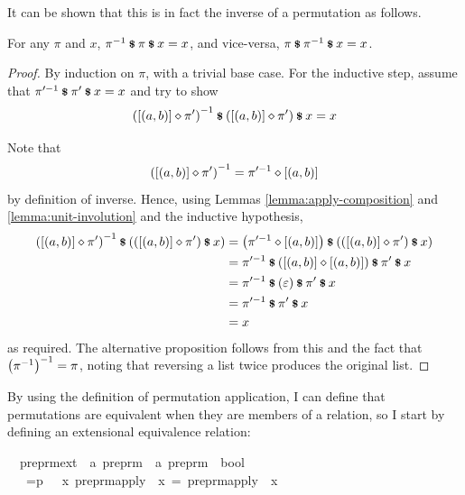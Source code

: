 It can be shown that this is in fact the inverse of a permutation as follows.
\begin{lemma}
\label{lemma:inverse-involution}
For any \(\pi\) and \(x\), \(\pi^{-1} \mathbin{\textrm{\footnotesize{\textbf{\$}}}} \pi \mathbin{\textrm{\footnotesize{\textbf{\$}}}} x = x\), and vice-versa, \(\pi \mathbin{\textrm{\footnotesize{\textbf{\$}}}} \pi^{-1} \mathbin{\textrm{\footnotesize{\textbf{\$}}}} x = x\).
\end{lemma}
\begin{proof}
By induction on \(\pi\), with a trivial base case.
For the inductive step, assume that \(\pi'^{-1} \mathbin{\textrm{\footnotesize{\textbf{\$}}}} \pi' \mathbin{\textrm{\footnotesize{\textbf{\$}}}} x = x\) and try to show
\[
\left([\left(a, b\right)] \diamond \pi'\right)^{-1} \mathbin{\textrm{\footnotesize{\textbf{\$}}}} \left([\left(a, b\right)] \diamond \pi'\right) \mathbin{\textrm{\footnotesize{\textbf{\$}}}} x = x
\]

Note that
\[
\left([\left(a, b\right)] \diamond \pi'\right)^{-1} = \pi'^{-1} \diamond [\left(a, b\right)]
\]
by definition of inverse.
Hence, using Lemmas \ref{lemma:apply-composition} and \ref{lemma:unit-involution} and the inductive hypothesis,
\begin{align*}
\left([\left(a, b\right)] \diamond \pi'\right)^{-1} \mathbin{\textrm{\footnotesize{\textbf{\$}}}} \left(\left([\left(a, b\right)] \diamond \pi'\right) \mathbin{\textrm{\footnotesize{\textbf{\$}}}} x\right)
&= \left(\pi'^{-1} \diamond [\left(a, b\right)]\right) \mathbin{\textrm{\footnotesize{\textbf{\$}}}} \left(\left([\left(a, b\right)] \diamond \pi'\right) \mathbin{\textrm{\footnotesize{\textbf{\$}}}} x\right)\\
&= \pi'^{-1} \mathbin{\textrm{\footnotesize{\textbf{\$}}}} \left([\left(a, b\right)] \diamond [\left(a, b\right)]\right) \mathbin{\textrm{\footnotesize{\textbf{\$}}}} \pi' \mathbin{\textrm{\footnotesize{\textbf{\$}}}} x\\
&= \pi'^{-1} \mathbin{\textrm{\footnotesize{\textbf{\$}}}} \left(\varepsilon\right) \mathbin{\textrm{\footnotesize{\textbf{\$}}}} \pi' \mathbin{\textrm{\footnotesize{\textbf{\$}}}} x\\
&= \pi'^{-1} \mathbin{\textrm{\footnotesize{\textbf{\$}}}} \pi' \mathbin{\textrm{\footnotesize{\textbf{\$}}}} x\\
&= x\\
\end{align*}
as required.
The alternative proposition follows from this and the fact that \(\left(\pi^{-1}\right)^{-1} = \pi\), noting that reversing a list twice produces the original list.
\end{proof}

By using the definition of permutation application, I can define that permutations are equivalent when they are members of a relation, so I start by defining an extensional equivalence relation:

\begin{implementation}
\isamarkupfalse%
\isanewline
\ \ preprm{\isacharunderscore}ext\ {\isacharcolon}{\isacharcolon}\ {\isachardoublequoteopen}{\isacharprime}a\ preprm\ {\isasymRightarrow}\ {\isacharprime}a\ preprm\ {\isasymRightarrow}\ bool{\isachardoublequoteclose}\isanewline
\ \ \isanewline
\ \ {\isachardoublequoteopen}{\isasympi}\ =p\ {\isasymsigma}\ {\isasymequiv}\ {\isasymforall}x{\isachardot}\ preprm{\isacharunderscore}apply\ {\isasympi}\ x\ =\ preprm{\isacharunderscore}apply\ {\isasymsigma}\ x{\isachardoublequoteclose}\isanewline
\end{implementation}

